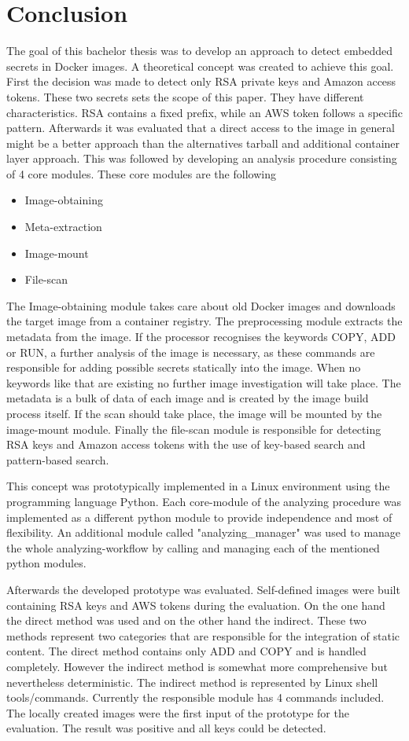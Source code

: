\chapter{Conclusion}
\label{ch:end:conclusion}
The goal of this bachelor thesis was to develop an approach to detect embedded secrets in Docker images. A theoretical concept was created to achieve this goal. First the decision was made to detect only RSA private keys and Amazon access tokens. These two secrets sets the scope of this paper. They have different characteristics. RSA contains a fixed prefix, while an AWS token follows a specific pattern.
Afterwards it was evaluated that a direct access to the image in general might be a better approach than the alternatives tarball and additional container layer approach. This was followed by developing an analysis procedure consisting of 4 core modules.
These core modules are the following
\begin{itemize}
\item Image-obtaining
\item Meta-extraction
\item Image-mount
\item File-scan
\end{itemize}
The Image-obtaining module takes care about old Docker images and downloads the target image from a container registry. The preprocessing module extracts the metadata from the image. If the processor recognises the keywords COPY, ADD or RUN, a further analysis of the image is necessary, as these commands are responsible for adding possible secrets statically into the image. When no keywords like that are existing no further image investigation will take place. The metadata is a bulk of data of each image and is created by the image build process itself. If the scan should take place, the image will be mounted by the image-mount module. Finally the file-scan module is responsible for detecting RSA keys and Amazon access tokens with the use of key-based search and pattern-based search.

This concept was prototypically implemented in a Linux environment using the programming language Python. Each core-module of the analyzing procedure was implemented as a different python module to provide independence and most of flexibility. An additional module called "analyzing\_manager" was used to manage the whole analyzing-workflow by calling and managing each of the mentioned python modules.

Afterwards the developed prototype was evaluated. Self-defined images were built containing RSA keys and AWS tokens during the evaluation. On the one hand the direct method was used and on the other hand the indirect.
These two methods represent two categories that are responsible for the integration of static content.
The direct method contains only ADD and COPY and is handled completely. However the indirect method is somewhat more comprehensive but nevertheless deterministic. The indirect method is represented by Linux shell tools/commands. Currently the responsible module has 4 commands included. The locally created images were the first input of the prototype for the evaluation. The result was positive and all keys could be detected.

